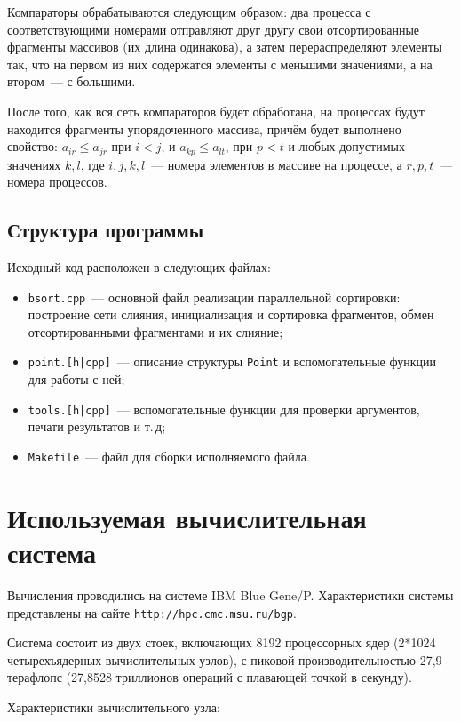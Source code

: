 \documentclass[oneside,final,14pt]{extreport}
\begin{document}
Компараторы обрабатываются следующим образом: два процесса с соответствующими
номерами отправляют друг другу свои отсортированные фрагменты массивов (их
длина одинакова), а затем перераспределяют элементы так, что на первом из
них содержатся элементы с меньшими значениями, а на втором~--- с большими.

После того, как вся сеть компараторов будет обработана, на процессах
будут находится фрагменты упорядоченного массива, причём будет выполнено
свойство: $a_{ir} \leq a_{jr}$ при $i < j$, и $a_{kp} \leq a_{lt}$, при
$p < t$ и любых допустимых значениях $k, l$, где $i, j, k, l$~--- номера
элементов в массиве на процессе, а $r, p, t$~--- номера процессов.

\section*{Структура программы}

Исходный код расположен в следующих файлах:
\begin{itemize}
    \item \texttt{bsort.cpp}~--- основной файл реализации параллельной сортировки:
        построение сети слияния, инициализация и сортировка фрагментов, обмен
        отсортированными фрагментами и их слияние;
    \item \texttt{point.[h|cpp]}~--- описание структуры \texttt{Point} и
        вспомогательные функции для работы с ней;
    \item \texttt{tools.[h|cpp]}~--- вспомогательные функции для проверки аргументов,
        печати результатов и т.\,д;
    \item \texttt{Makefile}~--- файл для сборки исполняемого файла.
\end{itemize}

\chapter*{Используемая вычислительная система}

Вычисления проводились на системе IBM Blue Gene/P.
Характеристики системы представлены на сайте \verb|http://hpc.cmc.msu.ru/bgp|.

Система состоит из двух стоек, включающих 8192 процессорных ядер
(2*1024 четырехъядерных вычислительных узлов), с пиковой производительностью
27,9 терафлопс (27,8528 триллионов операций с плавающей точкой в секунду).

Характеристики вычислительного узла:
\end{document}
